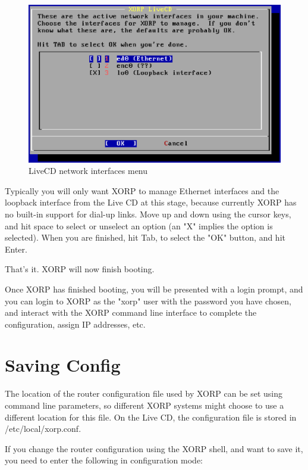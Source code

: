 \begin{figure}[h]
  \begin{center}
    \includegraphics[width=6.0in]{figs/cd4}
    \caption{LiveCD network interfaces menu}
    \label{fig:livecd:cd4}
  \end{center}
\end{figure}

Typically you will only want XORP to manage Ethernet interfaces and
the loopback interface from the Live CD at this stage, because currently
XORP has no built-in support for dial-up links.  Move up and down using the
cursor keys, and hit space to select or unselect an option (an "X"
implies the option is selected).  When you are finished, hit Tab, to
select the "OK" button, and hit Enter.

That's it.  XORP will now finish booting.

Once XORP has finished booting, you will be presented with a login
prompt, and you can login to XORP as the "xorp" user with the password
you have chosen, and interact with the XORP command line interface to
complete the configuration, assign IP addresses, etc.

\section{Saving Config}

The location of the router configuration file used by XORP can be set
using command line parameters, so different XORP systems might choose
to use a different location for this file.  On the Live CD, the
configuration file is stored in {\stt /etc/local/xorp.conf}.

If you change the router configuration using the XORP shell, and want
to save it, you need to enter the following in configuration mode:

